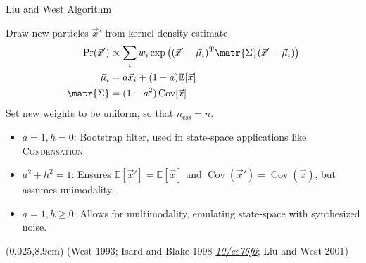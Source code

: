 \documentclass[xcolor=dvipsnames, compress]{beamer}
\renewcommand\UrlFont{\color{red}\rmfamily\itshape}
\newcommand{\shortdoi}[1]{\href{http://doi.org/#1}{\UrlFont 10/#1}}
\newcommand{\T}{\mathrm{T}}
\newcommand{\Cov}{\operatorname{Cov}}
\newcommand{\expect}{\mathbb{E}}
\newcommand{\bottomnote}[1]{
  \begin{textblock*}{0.95\paperwidth} (0.025\paperwidth,8.9cm)
    {\tiny \hfill #1}
  \end{textblock*}
}
\begin{document}
 
\begin{frame}{Liu and West Algorithm}
  
  Draw new particles $\vec{x}'$ from kernel density estimate
  \begin{align*}
    \Pr(\vec{x}') & \propto \sum_i w_i \exp\left((\vec{x}' - \vec{\mu}_i)^\T\matr{\Sigma}(\vec{x}' - \vec{\mu}_i)\right) \\
    \vec{\mu}_i & = a \vec{x}_i + (1 - a) \mathbb{E}[\vec{x}] \\
    \matr{\Sigma} & = (1 - a^2)\Cov[\vec{x}]
  \end{align*}
  Set new weights to be uniform, so that $n_{\text{ess}} = n$.

  \begin{itemize}
    \item $a = 1, h = 0$: Bootstrap filter, used in state-space applications
      like \textsc{Condensation}.
    \item $a^2 + h^2 = 1$: Ensures $\expect[\vec{x}'] = \expect[\vec{x}]$
      and $\Cov(\vec{x}') = \Cov(\vec{x})$, but assumes unimodality.
    \item $a = 1, h \ge 0$: Allows for multimodality, emulating state-space
      with synthesized noise.
  \end{itemize}
  
  \bottomnote{(West 1993;  Isard and Blake 1998 \shortdoi{cc76f6}; Liu and West 2001)}
  
\end{frame}
\end{document}
